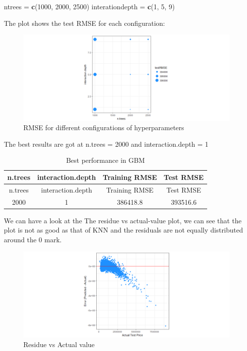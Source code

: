 \documentclass[]{article}
\newenvironment{Shaded}{\begin{snugshade}}{\end{snugshade}}
\newcommand{\KeywordTok}[1]{\textcolor[rgb]{0.13,0.29,0.53}{\textbf{#1}}}
\newcommand{\DecValTok}[1]{\textcolor[rgb]{0.00,0.00,0.81}{#1}}
\newcommand{\StringTok}[1]{\textcolor[rgb]{0.31,0.60,0.02}{#1}}
\newcommand{\NormalTok}[1]{#1}
\begin{document}
\begin{Shaded}
\begin{Highlighting}[]
\NormalTok{ntrees =}\StringTok{ }\KeywordTok{c}\NormalTok{(}\DecValTok{1000}\NormalTok{, }\DecValTok{2000}\NormalTok{, }\DecValTok{2500}\NormalTok{)}
\NormalTok{interationdepth =}\StringTok{ }\KeywordTok{c}\NormalTok{(}\DecValTok{1}\NormalTok{, }\DecValTok{5}\NormalTok{, }\DecValTok{9}\NormalTok{)}
\end{Highlighting}
\end{Shaded}

The plot shows the test RMSE for each configuration:

\begin{figure}
\centering
\includegraphics{Report_files/figure-latex/unnamed-chunk-24-1.pdf}
\caption{RMSE for different configurations of hyperparameters}
\end{figure}

The best results are got at n.trees = 2000 and interaction.depth = 1

\begin{longtable}[]{@{}cccc@{}}
\caption{Best performance in GBM}\tabularnewline
\toprule
n.trees & interaction.depth & Training RMSE & Test RMSE\tabularnewline
\midrule
\endfirsthead
\toprule
n.trees & interaction.depth & Training RMSE & Test RMSE\tabularnewline
\midrule
\endhead
2000 & 1 & 386418.8 & 393516.6\tabularnewline
\bottomrule
\end{longtable}

We can have a look at the The residue vs actual-value plot, we can see
that the plot is not as good as that of KNN and the residuals are not
equally distributed around the 0 mark.

\begin{figure}
\centering
\includegraphics{Report_files/figure-latex/unnamed-chunk-26-1.pdf}
\caption{Residue vs Actual value}
\end{figure}
\end{document}

